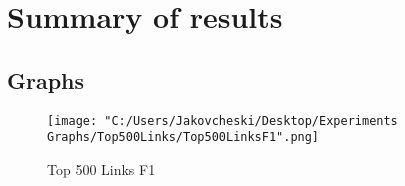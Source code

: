 \documentclass[thesis=M,english]{FITthesis}[2018/05/30]
\begin{document}




	
\section{Summary of results}
\subsection{Graphs}
	\begin{figure}[!htb]\centering
		\texttt{[image: "C:/Users/Jakovcheski/Desktop/Experiments Graphs/Top500Links/Top500LinksF1".png]}
		\caption{Top 500 Links F1}\label{}
	\end{figure}
	
\end{document}
